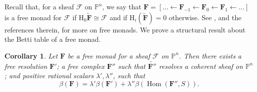 \documentclass[12pt]{amsart}
\newtheorem{cor}[lemma]{Corollary}
\theoremstyle{definition}
\theoremstyle{remark}
\newcommand{\Hom}{\operatorname{Hom}} %
\newcommand{\PP}{\mathbb{P}}
\newcommand{\HH}{\mathrm{H}}
\newcommand{\cF}{\mathcal{F}}
\newcommand{\FF}{\mathbf{F}}
\newcommand{\defi}[1]{\textsf{#1}} %
\begin{document}
Recall that, for a sheaf $\cF$ on $\PP^n$, we say that $\FF=[\dots \gets \FF_{-1}\gets \FF_0\gets \FF_1\gets \dots]$ is a \defi{free monad} for $\cF$ if $\HH_0\widetilde{\FF}\cong \cF$ and if $\HH_i(\widetilde{\FF})=0$ otherwise.   See \cite[\S8]{eis-floy-schrey}, and the references therein, for more on free monads.  We prove a structural result about the Betti table of a free monad. 
\begin{cor}\label{cor:monads}
Let $\FF$ be a free monad for a sheaf $\cF$ on $\PP^n$.  Then there exists a free resolution $\FF'$; a free complex $\FF''$ such that $\widetilde{\FF''}$ resolves a coherent sheaf on $\PP^n$; and positive rational scalars $\lambda', \lambda''$, such that
\[
\beta(\FF)=\lambda'\beta(\FF')+\lambda''\beta(\Hom(\FF'',S)).
\]
\end{cor}
\end{document}
